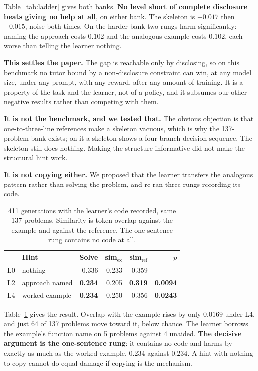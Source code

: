 \documentclass[conference]{IEEEtran}
\begin{document}
Table~\ref{tab:ladder} gives both banks. \textbf{No level short of complete
disclosure beats giving no help at all}, on either bank. The skeleton is
$+0.017$ then $-0.015$, noise both times. On the harder bank two rungs harm
significantly: naming the approach costs $0.102$ and the analogous example
costs $0.102$, each worse than telling the learner nothing.

\textbf{This settles the paper.} The gap is reachable only by disclosing, so on
this benchmark no tutor bound by a non-disclosure constraint can win, at any
model size, under any prompt, with any reward, after any amount of training. It
is a property of the task and the learner, not of a policy, and it subsumes our
other negative results rather than competing with them.

\textbf{It is not the benchmark, and we tested that.} The obvious objection is
that one-to-three-line references make a skeleton vacuous, which is why the
137-problem bank exists; on it a skeleton shows a four-branch decision
sequence. The skeleton still does nothing. Making the structure informative did
not make the structural hint work.

\textbf{It is not copying either.} We proposed that the learner transfers the
analogous pattern rather than solving the problem, and re-ran three rungs
recording its code.

\begin{table}[t]
\caption{411 generations with the learner's code recorded, same 137 problems.
Similarity is token overlap against the example and against the reference. The
one-sentence rung contains no code at all.}
\label{tab:anchor}
\centering
\small
\begin{tabular}{llrrrr}
\toprule
 & \textbf{Hint} & \textbf{Solve} & \textbf{sim}$_{\text{ex}}$ &
 \textbf{sim}$_{\text{ref}}$ & \textbf{$p$} \\
\midrule
L0 & nothing        & 0.336 & 0.233 & 0.359 & --- \\
L2 & approach named & \textbf{0.234} & 0.205 & \textbf{0.319} & \textbf{0.0094} \\
L4 & worked example & \textbf{0.234} & 0.250 & 0.356 & \textbf{0.0243} \\
\bottomrule
\end{tabular}
\end{table}

Table~\ref{tab:anchor} gives the result. Overlap with the example rises by only
$0.0169$ under L4, and just 64 of 137 problems move toward it, below chance.
The learner borrows the example's function name on 5 problems against 4
unaided. \textbf{The decisive argument is the one-sentence rung}: it contains
no code and harms by exactly as much as the worked example, $0.234$ against
$0.234$. A hint with nothing to copy cannot do equal damage if copying is the
mechanism.
\end{document}
